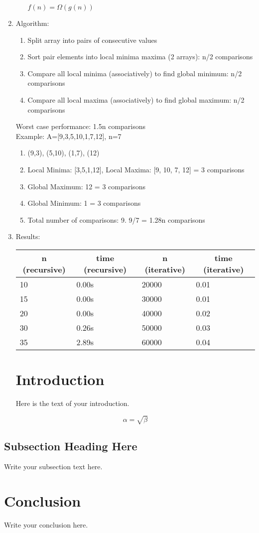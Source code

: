\documentclass{article}
\begin{document}
\begin{enumerate}
\begin{enumerate}
     $f(n) = \Omega(g(n))$
   \end{enumerate}


  \item Algorithm:
    \begin{enumerate}
        \item Split array into pairs of consecutive values
        \item Sort pair elements into local minima maxima (2 arrays): n/2 comparisons
        \item Compare all local minima (associatively) to find global minimum: n/2 comparisons 
        \item Compare all local maxima (associatively) to find global maximum: n/2 comparisons 

     \end{enumerate}
     Worst case performance: 1.5n comparisons\\

     Example: A=[9,3,5,10,1,7,12], n=7
     \begin{enumerate}
       \item (9,3), (5,10), (1,7), (12)
       \item Local Minima: [3,5,1,12], Local Maxima: [9, 10, 7, 12] = 3 comparisons
       \item Global Maximum: 12 = 3 comparisons
       \item Global Minimum: 1 = 3 comparisons 
       \item Total number of comparisons: 9.  9/7 = 1.28n comparisons
     \end{enumerate}
  \item Results:
    \begin{tabular}{|l|l|l|l|}
    \hline
    \multicolumn{1}{c}{\bfseries n (recursive)} & \multicolumn{1}{c}{\bfseries time (recursive)} & \multicolumn{1}{c}{\bfseries n (iterative)} & \multicolumn{1}{c}{\bfseries time (iterative)} \\ \hline
    10 & 0.00s & 20000 & 0.01 \\ \hline
    15 & 0.00s & 30000 & 0.01 \\ \hline
    20 & 0.00s & 40000 & 0.02 \\ \hline
    30 & 0.26s & 50000 & 0.03 \\ \hline
    35 & 2.89s & 60000 & 0.04 \\ \hline
    \end{tabular}
\section{Introduction}
Here is the text of your introduction.

\begin{equation}
    \label{simple_equation}
    \alpha = \sqrt{ \beta }
\end{equation}

\end{enumerate}

\subsection{Subsection Heading Here}
Write your subsection text here.


\section{Conclusion}
Write your conclusion here.
\end{document}
